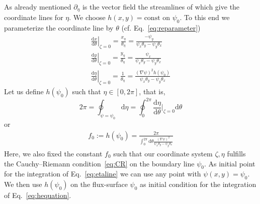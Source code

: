 \documentclass{hitec} %
\renewcommand{\d}{\mathrm{d}}
\begin{document}
As already mentioned $\partial_\eta$ is the vector field the streamlines of which give the 
coordinate lines for $\eta$. We choose $h(x,y) = \text{const}$ on $\psi_0$. To this end
we parameterize the coordinate line by $\theta$ (cf. Eq.~\eqref{eq:reparameter})
\begin{subequations}
\begin{align}
  \left . \frac{\d x}{\d \theta}\right|_{\zeta=0}=\frac{x_\eta}{\theta_\eta} = \frac{-\psi_y}{\psi_x\theta_y - \psi_y \theta_x}\\
  \left . \frac{\d y}{\d \theta}\right|_{\zeta=0}=\frac{y_\eta}{\theta_\eta} = \frac{\psi_x}{\psi_x\theta_y - \psi_y \theta_x}\\
  \left . \frac{\d \eta}{\d \theta}\right|_{\zeta=0}=\frac{1}{\theta_\eta} = \frac{(\nabla\psi)^2h(\psi_0)}{\psi_x\theta_y - \psi_y \theta_x}
\end{align}
  \label{eq:etaline}
\end{subequations}
Let us define $h(\psi_0)$ such that $\eta \in [0,2\pi]$, that is,
\[ 2\pi = \oint_{\psi=\psi_0}\d \eta = \oint_0^{2\pi} \frac{\d \eta}{\d\theta}\bigg|_{\zeta=0}\d \theta \nonumber \]
  or 
\begin{align}
  f_0 := h(\psi_0) = \frac{2\pi}{\int_0^{2\pi}\d\theta \frac{(\nabla\psi)^2}{\psi_x\theta_y - \psi_y \theta_x}}
  \label{eq:definef}
\end{align}
Here, we also fixed the constant $f_0$ such that our coordinate system $\zeta, \eta$ fulfills the Cauchy--Riemann condition~\eqref{eq:CR} on the boundary line $\psi_0$. 
As initial point for the integration of Eq.~\eqref{eq:etaline} we can use any point with $\psi(x,y) = \psi_0$.
We then use $h(\psi_0)$ on the flux-surface $\psi_0$ as initial condition for the integration 
of Eq.~\eqref{eq:hequation}.
\end{document}
